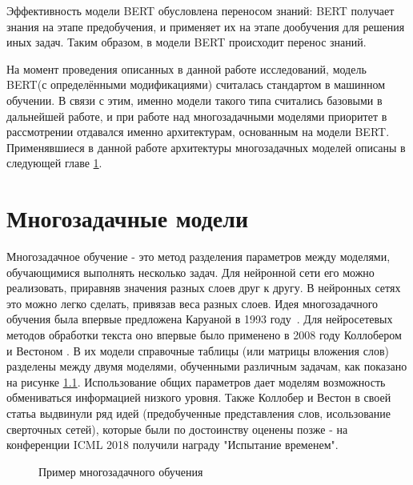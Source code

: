 Эффективность модели BERT обусловлена переносом знаний: BERT получает знания на этапе предобучения, и применяет их на этапе дообучения для решения иных задач. Таким образом, в модели BERT происходит перенос знаний. 

На момент проведения описанных в данной работе исследований, модель BERT(с определёнными модификациями) считалась стандартом в машинном обучении. В связи с этим, именно модели такого типа считались базовыми в дальнейшей работе, и при работе над многозадачными моделями приоритет в рассмотрении отдавался именно архитектурам, основанным на модели BERT. Применявшиеся в данной работе архитектуры многозадачных моделей описаны в следующей главе \ref{ch:mtl}.

\chapter{Многозадачные модели}\label{ch:mtl} 

Многозадачное обучение - это метод разделения параметров между моделями, обучающимися выполнять несколько задач. Для нейронной сети его можно реализовать, приравняв значения разных слоев друг к другу.  В нейронных сетях это можно легко сделать, привязав веса разных слоев.  Идея многозадачного обучения была впервые предложена Каруаной в 1993 году~\cite{caruana_1997}. Для нейросетевых методов обработки текста оно впервые было применено в 2008 году Коллобером и Вестоном \cite{collobert_2008}. В их модели справочные таблицы (или матрицы вложения слов) разделены между двумя моделями, обученными различным задачам, как показано на рисунке \ref{fig:MTL1}.
Использование общих параметров дает моделям возможность обмениваться информацией низкого уровня. Также Коллобер и Вестон в своей статьа выдвинули ряд идей (предобученные представления слов, исользование сверточных сетей), которые были по достоинству оценены позже - на конференции ICML 2018 получили награду "Испытание временем".


\begin{figure}[ht]
  \caption{Пример многозадачного обучения}\label{fig:MTL1}
\end{figure}

